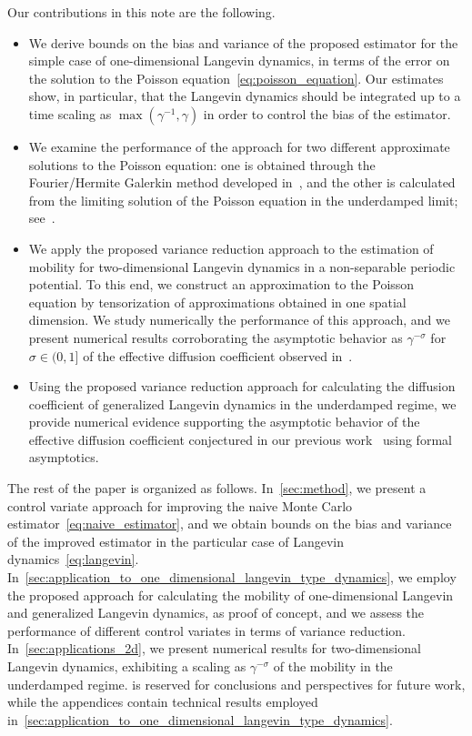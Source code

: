 \documentclass[11pt,a4paper]{article}
\theoremstyle{plain}
\numberwithin{equation}{section}
\begin{document}
Our contributions in this note are the following.
\begin{itemize}
    \item
        We derive bounds on the bias and variance of the proposed estimator for the simple case of one-dimensional Langevin dynamics,
        in terms of the error on the solution to the Poisson equation~\eqref{eq:poisson_equation}.
        Our estimates show, in particular, that the Langevin dynamics should be integrated up to a time scaling as $\max(\gamma^{-1}, \gamma)$ in order to control the bias of the estimator.
    \item
        We examine the performance of the approach for two different approximate solutions to the Poisson equation:
        one is obtained through the Fourier/Hermite Galerkin method developed in~\cite{roussel2018spectral},
        and the other is calculated from the limiting solution of the Poisson equation in the underdamped limit;
        see~\cite{MR2427108}.
    \item
        We apply the proposed variance reduction approach to the estimation of mobility for two-dimensional Langevin dynamics in a non-separable periodic potential.
        To this end, we construct an approximation to the Poisson equation by tensorization of approximations obtained in one spatial dimension.
        We study numerically the performance of this approach,
        and we present numerical results corroborating the asymptotic behavior as $\gamma^{-\sigma}$ for $\sigma \in (0, 1]$ of the effective diffusion coefficient
        observed in~\cite{roussel_thesis}.
    \item
        Using the proposed variance reduction approach
        for calculating the diffusion coefficient of generalized Langevin dynamics in the underdamped regime,
        we provide numerical evidence supporting the asymptotic behavior of the effective diffusion coefficient conjectured in our previous work~\cite{GPGSUV21} using formal asymptotics.
\end{itemize}
The rest of the paper is organized as follows.
In~\cref{sec:method},
we present a control variate approach for improving the naive Monte Carlo estimator~\eqref{eq:naive_estimator},
and we obtain bounds on the bias and variance of the improved estimator in the particular case of Langevin dynamics~\eqref{eq:langevin}.
In~\cref{sec:application_to_one_dimensional_langevin_type_dynamics},
we employ the proposed approach for calculating the mobility of one-dimensional Langevin and generalized Langevin dynamics,
as proof of concept,
and we assess the performance of different control variates in terms of variance reduction.
In~\cref{sec:applications_2d},
we present numerical results for two-dimensional Langevin dynamics,
exhibiting a scaling as $\gamma^{-\sigma}$ of the mobility in the underdamped regime.
 is reserved for conclusions and perspectives for future work,
while the appendices contain technical results employed in~\cref{sec:application_to_one_dimensional_langevin_type_dynamics}.
\end{document}

